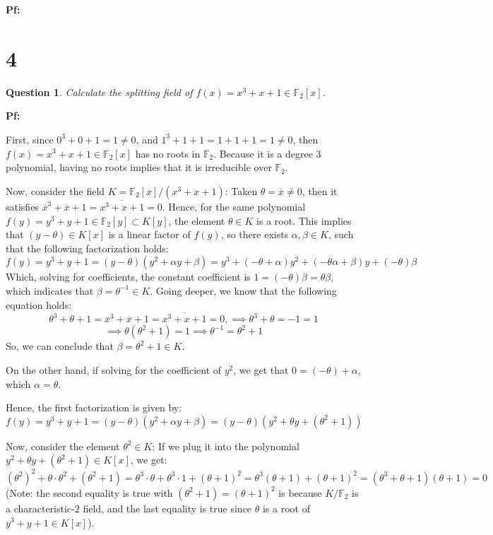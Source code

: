 \documentclass{article}
\newtheorem{question}{Question}
\begin{document}
\textbf{Pf:}

\break

\section*{4}
\begin{myBox}[]{}
    \begin{question}
        Calculate the splitting field of $f(x)=x^3+x+1\in\mathbb{F}_2[x]$.
    \end{question}
\end{myBox}

\textbf{Pf:}

First, since $0^3+0+1 = 1 \neq 0$, and $1^3+1+1 = 1+1+1 = 1\neq 0$, then $f(x)=x^3+x+1\in\mathbb{F}_2[x]$ has no roots in $\mathbb{F}_2$. Because it is a degree $3$ polynomial, having no roots implies that it is irreducible over $\mathbb{F}_2$.

Now, consider the field $K=\mathbb{F}_2[x]/(x^3+x+1)$: Taken $\theta=\overline{x}\neq 0$, then it satisfies $\overline{x}^3 +\overline{x}+1 = \overline{x^3+x+1} = 0$. Hence, for the same polynomial $f(y)=y^3+y+1\in \mathbb{F}_2[y]\subset K[y]$, the element $\theta\in K$ is a root. This implies that $(y-\theta)\in K[x]$ is a linear factor of $f(y)$, so there exists $\alpha,\beta\in K$, such that the following factorization holds:
$$f(y)=y^3+y+1 = (y-\theta)(y^2+\alpha y + \beta) = y^3 + (-\theta+\alpha)y^2 + (-\theta\alpha+\beta)y + (-\theta)\beta$$
Which, solving for coefficients, the constant coefficient is $1 = (-\theta)\beta = \theta\beta$, which indicates that $\beta = \theta^{-1}\in K$. Going deeper, we know that the following equation holds:
$$\theta^3 + \theta +1 = \overline{x}^3+\overline{x}+1 = \overline{x^3+x+1}=0,\implies \theta^3+\theta = -1 = 1$$
$$\implies \theta(\theta^2+1)=1\implies \theta^{-1} = \theta^2+1$$
So, we can conclude that $\beta = \theta^2+1\in K$.

On the other hand, if solving for the coefficient of $y^2$, we get that $0 = (-\theta) + \alpha$, which $\alpha =\theta$. 

Hence, the first factorization is given by:
$$f(y)=y^3+y+1 = (y-\theta)(y^2+\alpha y+\beta)= (y-\theta)(y^2+\theta y + (\theta^2+1))$$

\hfil

Now, consider the element $\theta^2 \in K$: If we plug it into the polynomial $y^2+\theta y + (\theta^2+1)\in K[x]$, we get:
$$(\theta^2)^2 + \theta\cdot \theta^2 + (\theta^2+1) = \theta^3\cdot \theta + \theta^3\cdot 1 + (\theta+1)^2 = \theta^3(\theta+1)+(\theta+1)^2= (\theta^3+\theta+1)(\theta+1) = 0$$
(Note: the second equality is true with $(\theta^2+1)=(\theta+1)^2$ is because $K/\mathbb{F}_2$ is a characteristic-$2$ field, and the last equality is true since $\theta$ is a root of $y^3+y+1\in K[x]$).
\end{document}
